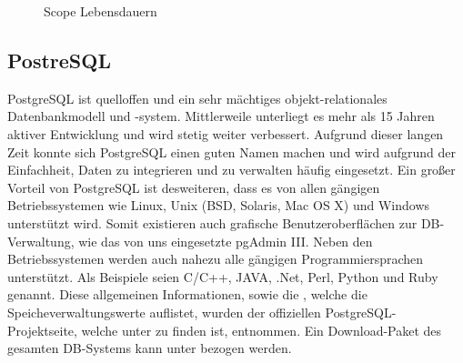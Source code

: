 \begin{figure}
\centering{}
\caption[\textbf{Scope Labensdauern}]{Scope Lebensdauern}
\label{fig:ScopeLfTme}
\end{figure}

\subsection{PostreSQL}

PostgreSQL ist quelloffen und ein sehr mächtiges objekt-relationales Datenbankmodell und -system. Mittlerweile unterliegt es mehr als 15 Jahren aktiver Entwicklung und wird stetig weiter verbessert. Aufgrund dieser langen Zeit konnte sich PostgreSQL einen guten Namen machen und wird aufgrund der Einfachheit, Daten zu integrieren und zu verwalten häufig eingesetzt.
Ein großer Vorteil von PostgreSQL ist desweiteren, dass es von allen gängigen Betriebssystemen wie Linux, Unix (BSD, Solaris, Mac OS X) und Windows unterstützt wird. Somit existieren auch grafische Benutzeroberflächen zur \ac{DB}-Verwaltung, wie das von uns eingesetzte \gls{pgAdmin III}.
Neben den Betriebssystemen werden auch nahezu alle gängigen Programmiersprachen unterstützt. Als Beispiele seien \gls{C/C++}, \gls{JAVA}, \gls{.Net}, \gls{Perl}, \gls{Python} und \gls{Ruby} genannt.
Diese allgemeinen Informationen, sowie die , welche die Speicheverwaltungswerte auflistet, wurden der offiziellen PostgreSQL-Projektseite, welche unter \cite{PostgreSQLAllg} zu finden ist, entnommen. Ein Download-Paket des gesamten \ac{DB}-Systems kann unter \cite{PostgreSQLDwnld} bezogen werden. 

